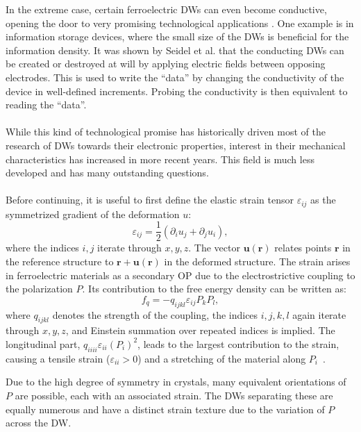 In the extreme case, certain ferroelectric DWs can even become conductive, opening the door to very promising technological applications \cite{Seidel2009}.
One example is in information storage devices, where the small size of the DWs is beneficial for the information density.
It was shown by Seidel et al.\cite{Seidel2009} that the conducting DWs can be created or destroyed at will by applying electric fields between opposing electrodes. This is used to write the ``data'' by changing the conductivity of the device in well-defined increments.
Probing the conductivity is then equivalent to reading the ``data''. 
\\\\
While this kind of technological promise has historically driven most of the research of DWs towards their electronic properties, interest in their mechanical characteristics has increased in more recent years.
This field is much less developed and has many outstanding questions.
\\\\
Before continuing, it is useful to first define the elastic strain tensor $\varepsilon_{ij}$ as the symmetrized gradient of the deformation $u$:
\begin{equation}
\varepsilon_{ij} = \frac{1}{2}(\partial_i u_j + \partial_j u_i),
\end{equation}
where the indices $i,j$ iterate through $x, y, z$.
The vector $\bm{u}(\bm{r})$ relates points $\bm{r}$ in the reference structure to $\bm{r} + \bm{u}(\bm{r})$ in the deformed structure.
The strain arises in ferroelectric materials as a secondary OP due to the electrostrictive coupling to the polarization $P$.
Its contribution to the free energy density can be written as:
\begin{equation}
	\label{eq:BTO_electrostriction}
	f_{q}=-q_{ijkl}\varepsilon_{ij}P_{k}P_{l},
\end{equation}
where $q_{ijkl}$ denotes the strength of the coupling, the indices $i, j, k, l$ again iterate through $x, y, z$, and Einstein summation over repeated indices is implied.
The longitudinal part, $q_{iiii} \varepsilon_{ii} (P_i)^2$, leads to the largest contribution to the strain, causing a tensile strain ($\varepsilon_{ii}>0$) and a stretching of the material along $P_i$~\cite{Marton2010}.

Due to the high degree of symmetry in crystals, many equivalent orientations of $P$ are possible, each with an associated strain. The DWs separating these are equally numerous and have a distinct strain texture due to the variation of $P$ across the DW.

